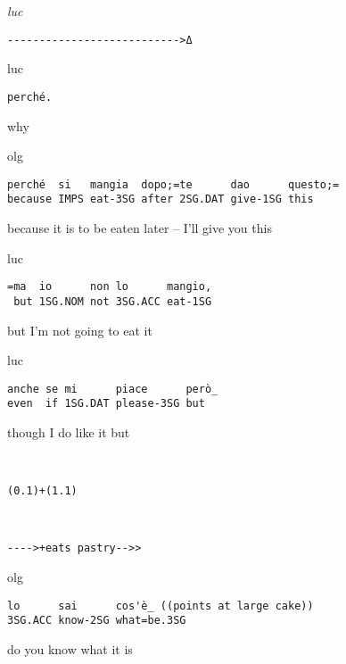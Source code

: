 \documentclass[output=paper,modfonts]{langscibook}
\begin{document}
%
\begin{transbox}{13}{\textit{luc}}
\begin{verbatim}
--------------------------->Δ
\end{verbatim}
\end{transbox}
%
%
\begin{mdframednoverticalspace}[style=secondfoc]
\begin{transbox}{15}{luc}
\begin{verbatim}
perché.
\end{verbatim}
why
\end{transbox}
\end{mdframednoverticalspace}\vspace{1mm}
%
\begin{mdframednoverticalspace}[style=firstfoc]
\begin{transbox}{16}{olg}
\begin{verbatim}
perché  si   mangia  dopo;=te      dao      questo;=
because IMPS eat-3SG after 2SG.DAT give-1SG this
\end{verbatim}
because it is to be eaten later -- I'll give you this
\end{transbox}
\end{mdframednoverticalspace}
%
%
\begin{mdframednoverticalspace}[style=secondfoc]
\begin{transbox}{17}{luc}
\begin{verbatim}
=ma  io      non lo      mangio,
 but 1SG.NOM not 3SG.ACC eat-1SG
\end{verbatim}
\hspace{0.07cm} but I'm not going to eat it
\end{transbox}
\end{mdframednoverticalspace}\vspace{1mm}
%
%
\begin{transbox}{19}{luc}
\begin{verbatim}
anche se mi      piace      però_
even  if 1SG.DAT please-3SG but
\end{verbatim}
though I do like it but
\end{transbox}\vspace{1mm}
%
\begin{transbox}{20}{~}
\begin{verbatim}
(0.1)+(1.1)
\end{verbatim}
\end{transbox}
%
\begin{transbox}{21}{~}
\begin{verbatim}
---->+eats pastry-->>
\end{verbatim}
\end{transbox}\vspace{-2mm}
%
\begin{transbox}{22}{olg}
\begin{verbatim}
lo      sai      cos'è_ ((points at large cake))
3SG.ACC know-2SG what=be.3SG
\end{verbatim}
do you know what it is
\end{transbox}\medskip
\end{document}
